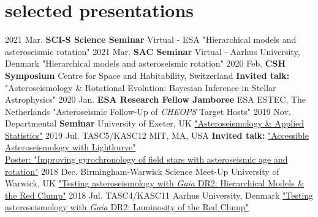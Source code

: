 \documentclass[letterpaper]{k-cv} %
\begin{document}
\section{\color{c1}selected presentations}

\begin{entrylist}
\entry
{2021 Mar.}
{\textbf{SCI-S Science \textcolor{c1}{Seminar}}}
{Virtual - ESA}
{"Hierarchical models and asteroseismic rotation"}
\entry
{2021 Mar.}
{\textbf{SAC \textcolor{c1}{Seminar}}}
{Virtual - Aarhus University, Denmark}
{"Hierarchical models and asteroseismic rotation"}
\entry
{2020 Feb.}
{\textbf{CSH Symposium}}
{Centre for Space and Habitability, Switzerland}
{\textbf{\textcolor{c1}{Invited talk:}} "Asteroseismology \& Rotational Evolution: Bayesian Inference in Stellar Astrophysics"}
\entry
{2020 Jan.}
{\textbf{ESA Research Fellow Jamboree}}
{ESA ESTEC, The Netherlands}
{"Asteroseismic Follow-Up of \textit{CHEOPS} Target Hosts"}
\entry
{2019 Nov.}
{Departmental \textbf{\textcolor{c1}{Seminar}}}
{University of Exeter, UK}
{\href{https://speakerdeck.com/ojhall94/seminar-asteroseismology-and-applied-statistics}{"Asteroseismology \& Applied Statistics"}}
\entry
{2019 Jul.}
{TASC5/KASC12}
{MIT, MA, USA}
{\textbf{\textcolor{c1}{Invited talk:}} \href{https://speakerdeck.com/ojhall94/accessible-asteroseismology-with-lightkurve}{"Accessible Asteroseismology with Lightkurve"\\ \small{Poster: "Improving gyrochronology of field stars with asteroseismic age and rotation"}}}
\entry
{2018 Dec.}
{Birmingham-Warwick Science 
	Meet-Up}
{University of Warwick, UK}
{\href{https://speakerdeck.com/ojhall94/testing-asteroseismology-with-gaia-dr2-hierarchical-models-and-the-red-clump}{"Testing asteroseismology with \textit{Gaia} DR2: Hierarchical Models \& the Red Clump"}}
\entry
{2018 Jul.}
{TASC4/KASC11}
{Aarhus University, Denmark}
{\href{https://speakerdeck.com/ojhall94/testing-asteroseismology-with-gaia-dr2-luminosity-of-the-red-clump}{"Testing asteroseismology with \textit{Gaia} DR2: Luminosity of the Red Clump"}}
\end{entrylist}
\end{document}
